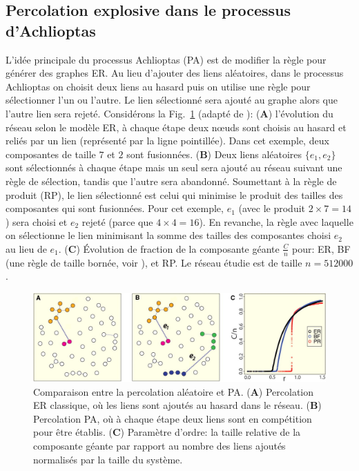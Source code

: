 \subsection{Percolation explosive dans le processus d'Achlioptas}

L'idée principale du processus Achlioptas (PA) \cite{Achlioptas-al2009} est de modifier la règle pour générer des graphes ER. Au lieu d'ajouter des liens aléatoires, dans le processus Achlioptas on choisit deux liens au hasard puis on utilise une règle pour sélectionner l'un ou l'autre. Le lien sélectionné sera ajouté au graphe alors que l'autre lien sera rejeté. Considérons la Fig.~\ref{achlioptas} (adapté de \cite{Achlioptas-al2009}): (\textbf{A}) l'évolution du réseau  selon le modèle ER, à chaque étape deux nœuds sont choisis au hasard et reliés par un lien (représenté par la ligne pointillée). Dans cet exemple, deux composantes de taille $7$ et $2$ sont fusionnées. (\textbf{B}) Deux liens aléatoires $\{e_1,e_2\}$ sont sélectionnés à chaque étape mais un seul sera ajouté au réseau suivant une règle de sélection, tandis que l'autre sera abandonné.
Soumettant à la règle de produit (RP), le lien sélectionné est celui qui minimise le produit des tailles des composantes qui sont fusionnées. Pour cet exemple, $e_1$ (avec le produit $2\times7=14$) sera choisi et $e_2$ rejeté (parce que $4\times4=16$). En revanche, la règle avec laquelle on sélectionne le lien minimisant la somme des tailles des composantes choisi $e_2$ au lieu de $e_1$. (\textbf{C}) Évolution de fraction de la composante géante  $\frac{C}{n}$ pour: ER, BF (une règle de taille bornée, voir \cite{Bohman-Frieze2001}), et RP. Le réseau étudie est de taille $n=512000$.
\begin{figure}[h!]
	\centering
	\includegraphics[scale=0.35]{./figures/achlioptas3}
	\caption{Comparaison entre la percolation aléatoire et PA. (\textbf{A}) Percolation ER classique, où les liens sont ajoutés au hasard dans le réseau. (\textbf{B}) Percolation PA, où à chaque étape deux liens sont en compétition pour être établis. (\textbf{C}) Paramètre d'ordre: la taille relative de la composante géante par rapport au nombre des liens ajoutés normalisés par la taille du système.}
	\label{achlioptas}
\end{figure}

